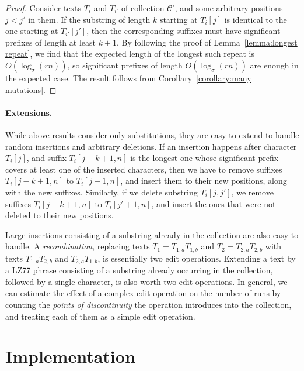 \begin{proof}
Consider texts $T_{i}$ and $T_{i'}$ of collection $\mathcal{C'}$, and some arbitrary positions $j < j'$ in them. If the substring of length $k$ starting at $T_{i}[j]$ is identical to the one starting at $T_{i'}[j']$, then the corresponding suffixes must have significant prefixes of length at least $k+1$. By following the proof of Lemma~\ref{lemma:longest repeat}, we find that the expected length of the longest such repeat is $O(\log_{\sigma} (rn))$, so significant prefixes of length $O(\log_{\sigma} (rn))$ are enough in the expected case. The result follows from Corollary~\ref{corollary:many mutations}.
\end{proof}

\paragraph{Extensions.}

While above results consider only substitutions, they are easy to extend to handle random insertions and arbitrary deletions. If an insertion happens after character $T_{i}[j]$, and suffix $T_{i}[j-k+1,n]$ is the longest one whose significant prefix covers at least one of the inserted characters, then we have to remove suffixes $T_{i}[j-k+1,n]$ to $T_{i}[j+1,n]$, and insert them to their new positions, along with the new suffixes. Similarly, if we delete substring $T_{i}[j,j']$, we remove suffixes $T_{i}[j-k+1,n]$ to $T_{i}[j'+1,n]$, and insert the ones that were not deleted to their new positions.

Large insertions consisting of a substring already in the collection are also easy to handle. A \emph{recombination}, replacing texts $T_{1} = T_{1,a} T_{1,b}$ and $T_{2} = T_{2,a} T_{2,b}$ with texts $T_{1,a} T_{2,b}$ and $T_{2,a} T_{1,b}$, is essentially two edit operations. Extending a text by a LZ77 phrase consisting of a substring already occurring in the collection, followed by a single character, is also worth two edit operations. In general, we can estimate the effect of a complex edit operation on the number of runs by counting the \emph{points of discontinuity} the operation introduces into the collection, and treating each of them as a simple edit operation.


\section{Implementation}\label{sect:rlcsa implementation}

